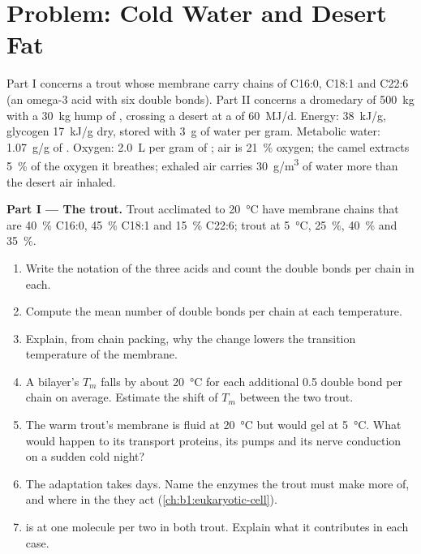 \section{Problem: Cold Water and Desert Fat}

\begin{problem}
\label{pb:b1:lipids:1}
Part I concerns a trout whose membrane  carry chains of
C16:0, C18:1 and C22:6 (an omega-3 acid with six double bonds). Part II
concerns a dromedary of \qty{500}{kg} with a \qty{30}{kg} hump of
, crossing a desert at a  of
\qty{60}{MJ/d}. Energy:  \qty{38}{kJ/g}, glycogen \qty{17}{kJ/g}
dry, stored with \qty{3}{g} of water per gram. Metabolic water:
\qty{1.07}{g/g} of . Oxygen: \qty{2.0}{L} per gram of ; air is
\qty{21}{\%} oxygen; the camel extracts \qty{5}{\%} of the oxygen it
breathes; exhaled air carries \qty{30}{g/m^3} of water more than the
desert air inhaled.

\medskip
\noindent\textbf{Part I --- The trout.}
Trout acclimated to \qty{20}{\celsius} have membrane chains that are
\qty{40}{\%} C16:0, \qty{45}{\%} C18:1 and \qty{15}{\%} C22:6; trout at
\qty{5}{\celsius}, \qty{25}{\%}, \qty{40}{\%} and \qty{35}{\%}.
\begin{enumerate}
  \item Write the notation of the three acids and count the double
        bonds per chain in each.
  \item Compute the mean number of double bonds per chain at each
        temperature.
  \item Explain, from chain packing, why the change lowers the
        transition temperature of the membrane.
  \item A bilayer's $T_m$ falls by about \qty{20}{\celsius} for each
        additional \qty{0.5}{} double bond per chain on average. Estimate
        the shift of $T_m$ between the two trout.
  \item The warm trout's membrane is fluid at \qty{20}{\celsius} but
        would gel at \qty{5}{\celsius}. What would happen to its
        transport proteins, its pumps and its nerve conduction on a
        sudden cold night?
  \item The adaptation takes days. Name the enzymes the trout must
        make more of, and where in the  they act (\cref{ch:b1:eukaryotic-cell}).
  \item {} is at one molecule per two  in both
        trout. Explain what it contributes in each case.
\end{enumerate}


\end{problem}
